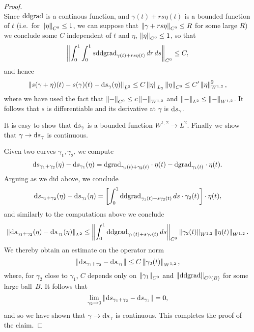 \begin{proof}
\begin{equation*}
  \end{equation*}
  Since $\mathrm{d}\mathrm{d}\mathrm{grad}$ is a continous function, and $\gamma(t)+rs\eta(t)$ is a bounded function of $t$ (i.e.\ for $\left\lVert\eta\right\rVert_{C^{0}}\le 1$, we can suppose that $\left\lVert\gamma+rs\eta\right\rVert_{C^{0}}\le R$ for some large $R$) we conclude some $C$ independent of $t$ and $\eta$, $\left\lVert\eta\right\rVert_{C^{0}}\le 1$, so that
  \begin{equation*} \left\lVert\int_{0}^{1}\int_{0}^{1}s\mathrm{d}\mathrm{d}\mathrm{grad}_{\gamma(t)+rs\eta(t)}\,dr\,ds\right\rVert_{C^{0}}\le C,
  \end{equation*}
  and hence
  \begin{equation*}
    \left\lVert s(\gamma+\eta)(t)-s(\gamma)(t)-\mathrm{d} s_{\gamma}(\eta)\right\rVert_{L^{2}}\le C\left\lVert\eta\right\rVert_{L_{2}}\left\lVert\eta\right\rVert_{C^{0}}\le C'\left\lVert\eta\right\rVert_{W^{1,2}}^{2},
  \end{equation*}
  where we have used the fact that $\left\lVert-\right\rVert_{C^{0}}\le c\left\lVert-\right\rVert_{W^{1,2}}$ and $\left\lVert-\right\rVert_{L^{2}}\le \left\lVert-\right\rVert_{W^{1,2}}$. It follows that $s$ is differentiable and its derivative at $\gamma$ is $\mathrm{d} s_{\gamma}$.

  It is easy to show that $\mathrm{d} s_{\gamma}$ is a bounded function $W^{1,2}\to L^{2}$. Finally we show that $\gamma\to \mathrm{d} s_{\gamma}$ is continuous.

  Given two curves $\gamma_{1},\gamma_{2}$, we compute
  \begin{equation*}
    \mathrm{d} s_{\gamma_{1}+\gamma_{2}}(\eta)-\mathrm{d} s_{\gamma_{1}}(\eta)=\mathrm{d} \mathrm{grad}_{\gamma_{1}(t)+\gamma_{2}(t)}\cdot \eta(t)-\mathrm{d}\mathrm{grad}_{\gamma_{1}(t)}\cdot \eta(t).
  \end{equation*}
  Arguing as we did above, we conclude
  \begin{equation*}
    \mathrm{d} s_{\gamma_{1}+\gamma_{2}} (\eta)-\mathrm{d} s_{\gamma_{1}}(\eta)=\left[\int_{0}^{1}\mathrm{d}\mathrm{d}\mathrm{grad}_{\gamma_{1}(t)+s\gamma_{2}(t)}\,ds\cdot \gamma_{2}(t)\right]\cdot \eta(t),
  \end{equation*}
  and similarly to the computations above we conclude
  \begin{equation*}
    \left\lVert\mathrm{d} s_{\gamma_{1}+\gamma_{2}}(\eta)-\mathrm{d} s_{\gamma_{1}}(\eta)\right\rVert_{L^{2}}\le \left\lVert\int_{0}^{1}\mathrm{d}\mathrm{d}\mathrm{grad}_{\gamma_{1}(t)+s\gamma_{2}(t)}\,ds\right\rVert_{C^{0}}\left\lVert\gamma_{2}(t)\right\rVert_{W^{1,2}}\left\lVert\eta(t)\right\rVert_{W^{1,2}}.
  \end{equation*}
  We thereby obtain an estimate on the operator norm
  \begin{equation*}
    \left\lVert\mathrm{d} s_{\gamma_{1}+\gamma_{2}}-\mathrm{d} s_{\gamma_{1}}\right\rVert\le C\left\lVert\gamma_{2}(t)\right\rVert_{W^{1,2}},
  \end{equation*}
  where, for $\gamma_{2}$ close to $\gamma_{1}$, $C$ depends only on $\left\lVert\gamma_{1}\right\rVert_{C^{0}}$ and $\left\lVert\mathrm{d}\mathrm{d}\mathrm{grad}\right\rVert_{C^{0}(B)}$ for some large ball~$B$. It follows that
  \begin{equation*}
    \lim_{\gamma_{2}\to 0}\left\lVert\mathrm{d} s_{\gamma_{1}+\gamma_{2}}-\mathrm{d} s_{\gamma_{1}}\right\rVert=0,
  \end{equation*}
  and so we have shown that $\gamma\to \mathrm{d} s_{\gamma}$ is continuous. This completes the proof of the claim. 
\end{proof}
